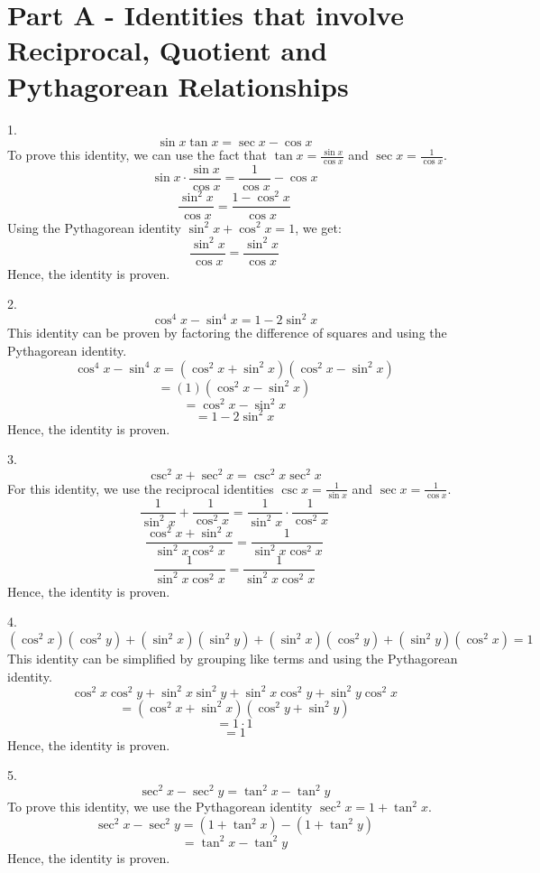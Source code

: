 \documentclass{article}
\begin{document}
\section*{Part A - Identities that involve Reciprocal, Quotient and Pythagorean Relationships}
1. $$\sin x \tan x = \sec x - \cos x$$
   To prove this identity, we can use the fact that \(\tan x = \frac{\sin x}{\cos x}\) and \(\sec x = \frac{1}{\cos x}\).
   \[\sin x \cdot \frac{\sin x}{\cos x} = \frac{1}{\cos x} - \cos x\]
   \[\frac{\sin^2 x}{\cos x} = \frac{1 - \cos^2 x}{\cos x}\]
   Using the Pythagorean identity \(\sin^2 x + \cos^2 x = 1\), we get:
   \[\frac{\sin^2 x}{\cos x} = \frac{\sin^2 x}{\cos x}\]
   Hence, the identity is proven.

\vspace{2em}
2. $$\cos^4 x - \sin^4 x = 1 - 2 \sin^2 x$$
   This identity can be proven by factoring the difference of squares and using the Pythagorean identity.
   \[\cos^4 x - \sin^4 x = (\cos^2 x + \sin^2 x)(\cos^2 x - \sin^2 x)\]
   \[= (1)(\cos^2 x - \sin^2 x)\]
   \[= \cos^2 x - \sin^2 x\]
   \[= 1 - 2\sin^2 x\]
   Hence, the identity is proven.   

\vspace{2em}
3. $$\csc^2 x + \sec^2 x = \csc^2 x \sec^2 x$$
   For this identity, we use the reciprocal identities \(\csc x = \frac{1}{\sin x}\) and \(\sec x = \frac{1}{\cos x}\).
   \[\frac{1}{\sin^2 x} + \frac{1}{\cos^2 x} = \frac{1}{\sin^2 x} \cdot \frac{1}{\cos^2 x}\]
   \[\frac{\cos^2 x + \sin^2 x}{\sin^2 x \cos^2 x} = \frac{1}{\sin^2 x \cos^2 x}\]
   \[\frac{1}{\sin^2 x \cos^2 x} = \frac{1}{\sin^2 x \cos^2 x}\]
   Hence, the identity is proven.

\vspace{2em}
4. $$\left(\cos^2 x\right)\left(\cos^2 y\right) + \left(\sin^2 x\right)\left(\sin^2 y\right) + \left(\sin^2 x\right)\left(\cos^2 y\right) + \left(\sin^2 y\right)\left(\cos^2 x\right) = 1$$
   This identity can be simplified by grouping like terms and using the Pythagorean identity.
   \[\cos^2 x \cos^2 y + \sin^2 x \sin^2 y + \sin^2 x \cos^2 y + \sin^2 y \cos^2 x\]
   \[= (\cos^2 x + \sin^2 x)(\cos^2 y + \sin^2 y)\]
   \[= 1 \cdot 1\]
   \[= 1\]
   Hence, the identity is proven.

\vspace{2em}
5. $$\sec^2 x - \sec^2 y = \tan^2 x - \tan^2 y$$
   To prove this identity, we use the Pythagorean identity \(\sec^2 x = 1 + \tan^2 x\).
   \[\sec^2 x - \sec^2 y = (1 + \tan^2 x) - (1 + \tan^2 y)\]
   \[= \tan^2 x - \tan^2 y\]
   Hence, the identity is proven.
\end{document}

